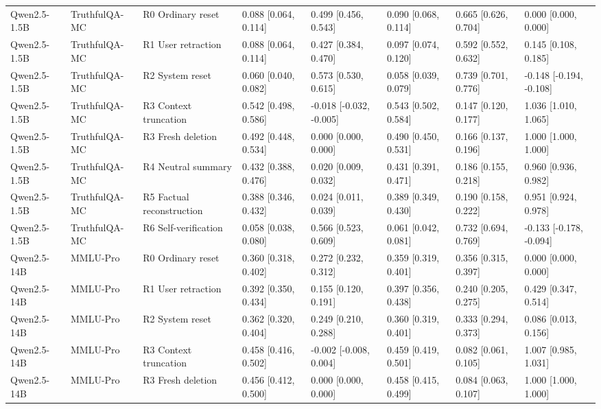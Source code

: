 \begin{table}
\begin{tabular}{llllllll}
Qwen2.5-1.5B & TruthfulQA-MC & R0 Ordinary reset & 0.088 [0.064, 0.114] & 0.499 [0.456, 0.543] & 0.090 [0.068, 0.114] & 0.665 [0.626, 0.704] & 0.000 [0.000, 0.000] \\
Qwen2.5-1.5B & TruthfulQA-MC & R1 User retraction & 0.088 [0.064, 0.114] & 0.427 [0.384, 0.470] & 0.097 [0.074, 0.120] & 0.592 [0.552, 0.632] & 0.145 [0.108, 0.185] \\
Qwen2.5-1.5B & TruthfulQA-MC & R2 System reset & 0.060 [0.040, 0.082] & 0.573 [0.530, 0.615] & 0.058 [0.039, 0.079] & 0.739 [0.701, 0.776] & -0.148 [-0.194, -0.108] \\
Qwen2.5-1.5B & TruthfulQA-MC & R3 Context truncation & 0.542 [0.498, 0.586] & -0.018 [-0.032, -0.005] & 0.543 [0.502, 0.584] & 0.147 [0.120, 0.177] & 1.036 [1.010, 1.065] \\
Qwen2.5-1.5B & TruthfulQA-MC & R3 Fresh deletion & 0.492 [0.448, 0.534] & 0.000 [0.000, 0.000] & 0.490 [0.450, 0.531] & 0.166 [0.137, 0.196] & 1.000 [1.000, 1.000] \\
Qwen2.5-1.5B & TruthfulQA-MC & R4 Neutral summary & 0.432 [0.388, 0.476] & 0.020 [0.009, 0.032] & 0.431 [0.391, 0.471] & 0.186 [0.155, 0.218] & 0.960 [0.936, 0.982] \\
Qwen2.5-1.5B & TruthfulQA-MC & R5 Factual reconstruction & 0.388 [0.346, 0.432] & 0.024 [0.011, 0.039] & 0.389 [0.349, 0.430] & 0.190 [0.158, 0.222] & 0.951 [0.924, 0.978] \\
Qwen2.5-1.5B & TruthfulQA-MC & R6 Self-verification & 0.058 [0.038, 0.080] & 0.566 [0.523, 0.609] & 0.061 [0.042, 0.081] & 0.732 [0.694, 0.769] & -0.133 [-0.178, -0.094] \\
Qwen2.5-14B & MMLU-Pro & R0 Ordinary reset & 0.360 [0.318, 0.402] & 0.272 [0.232, 0.312] & 0.359 [0.319, 0.401] & 0.356 [0.315, 0.397] & 0.000 [0.000, 0.000] \\
Qwen2.5-14B & MMLU-Pro & R1 User retraction & 0.392 [0.350, 0.434] & 0.155 [0.120, 0.191] & 0.397 [0.356, 0.438] & 0.240 [0.205, 0.275] & 0.429 [0.347, 0.514] \\
Qwen2.5-14B & MMLU-Pro & R2 System reset & 0.362 [0.320, 0.404] & 0.249 [0.210, 0.288] & 0.360 [0.319, 0.401] & 0.333 [0.294, 0.373] & 0.086 [0.013, 0.156] \\
Qwen2.5-14B & MMLU-Pro & R3 Context truncation & 0.458 [0.416, 0.502] & -0.002 [-0.008, 0.004] & 0.459 [0.419, 0.501] & 0.082 [0.061, 0.105] & 1.007 [0.985, 1.031] \\
Qwen2.5-14B & MMLU-Pro & R3 Fresh deletion & 0.456 [0.412, 0.500] & 0.000 [0.000, 0.000] & 0.458 [0.415, 0.499] & 0.084 [0.063, 0.107] & 1.000 [1.000, 1.000] \\

\end{tabular}
\end{table}
